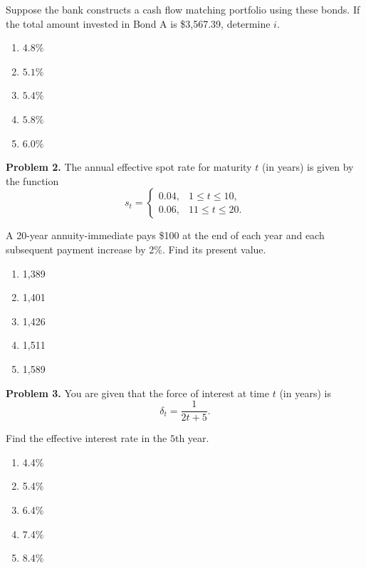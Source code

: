 \documentclass[12pt]{article}
\begin{document}
Suppose the bank constructs a cash flow matching portfolio using these bonds.  
If the total amount invested in Bond A is \$3,567.39, determine $i$.

\vspace{.5cm}



\begin{enumerate}[label = \Alph*.]
\item $4.8\%$
\item  $5.1\%$ 
\item  $5.4\%$ 
\item  $5.8\%$ 
\item $6.0\%$
\end{enumerate}

\newpage



\textbf{Problem 2.} The annual effective spot rate for maturity $t$ (in years) is given by the function
\[
s_t=
\begin{cases}
0.04, & 1\le t\le 10,\\
0.06, & 11\le t\le 20.
\end{cases}
\]


A 20-year annuity-immediate pays \$100 at the end of each year and each subsequent payment increase by 2\%. Find its present value.

\begin{enumerate}[label=\Alph*.]
    \item 1,389
    \item 1,401
    \item 1,426
    \item 1,511
    \item 1,589
\end{enumerate}


\newpage


\textbf{Problem 3.} You are given that the force of interest at time $t$ (in years) is \[\delta_t = \frac{1}{2t+5}.\]

Find the effective interest rate in the $5$th year.

\begin{enumerate}[label=\Alph*.]
    \item 4.4\%
    \item 5.4\%
    \item 6.4\%
    \item 7.4\%
    \item 8.4\%
\end{enumerate}


\newpage
\end{document}
